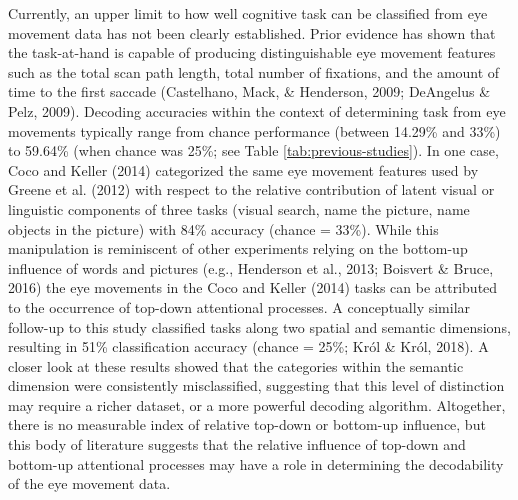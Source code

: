 \documentclass[
  english,
  man,floatsintext]{apa6}
\begin{document}
Currently, an upper limit to how well cognitive task can be classified from eye movement data has not been clearly established. Prior evidence has shown that the task-at-hand is capable of producing distinguishable eye movement features such as the total scan path length, total number of fixations, and the amount of time to the first saccade (Castelhano, Mack, \& Henderson, 2009; DeAngelus \& Pelz, 2009). Decoding accuracies within the context of determining task from eye movements typically range from chance performance (between 14.29\% and 33\%) to 59.64\% (when chance was 25\%; see Table \ref{tab:previous-studies}). In one case, Coco and Keller (2014) categorized the same eye movement features used by Greene et al. (2012) with respect to the relative contribution of latent visual or linguistic components of three tasks (visual search, name the picture, name objects in the picture) with 84\% accuracy (chance = 33\%). While this manipulation is reminiscent of other experiments relying on the bottom-up influence of words and pictures (e.g., Henderson et al., 2013; Boisvert \& Bruce, 2016) the eye movements in the Coco and Keller (2014) tasks can be attributed to the occurrence of top-down attentional processes. A conceptually similar follow-up to this study classified tasks along two spatial and semantic dimensions, resulting in 51\% classification accuracy (chance = 25\%; Król \& Król, 2018). A closer look at these results showed that the categories within the semantic dimension were consistently misclassified, suggesting that this level of distinction may require a richer dataset, or a more powerful decoding algorithm. Altogether, there is no measurable index of relative top-down or bottom-up influence, but this body of literature suggests that the relative influence of top-down and bottom-up attentional processes may have a role in determining the decodability of the eye movement data.
\end{document}
